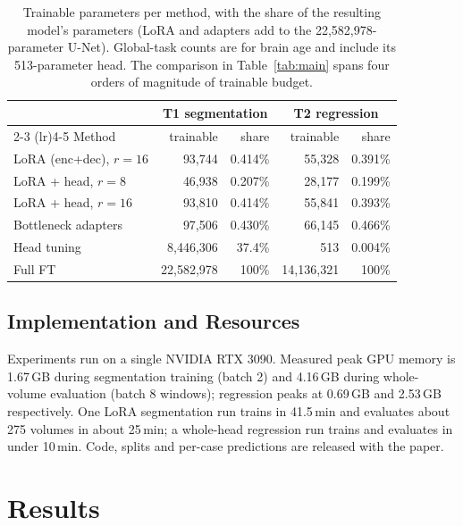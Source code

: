 \iffull\documentclass[journal]{IEEEtran}\else\documentclass[journal,twoside,web]{ieeecolor}\usepackage{generic}\fi
\begin{document}
\iffull  %
\begin{table}[t]
\caption{Trainable parameters per method, with the share of the resulting model's parameters (LoRA and adapters add to the 22,582,978-parameter U-Net). Global-task counts are for brain age and include its 513-parameter head. The comparison in Table~\ref{tab:main} spans four orders of magnitude of trainable budget.}
\label{tab:params}
\centering
\footnotesize
\setlength{\tabcolsep}{4pt}
\begin{tabular}{lrrrr}
\toprule
 & \multicolumn{2}{c}{T1 segmentation} & \multicolumn{2}{c}{T2 regression} \\
\cmidrule(lr){2-3} \cmidrule(lr){4-5}
Method & trainable & share & trainable & share \\
\midrule
LoRA (enc+dec), $r{=}16$  & 93,744     & 0.414\%  & 55,328     & 0.391\% \\
LoRA + head, $r{=}8$      & 46,938     & 0.207\%  & 28,177     & 0.199\% \\
LoRA + head, $r{=}16$     & 93,810     & 0.414\%  & 55,841     & 0.393\% \\
Bottleneck adapters       & 97,506     & 0.430\%  & 66,145     & 0.466\% \\
Head tuning         & 8,446,306  & 37.4\%   & 513        & 0.004\% \\
Full FT             & 22,582,978 & 100\%    & 14,136,321 & 100\% \\
\bottomrule
\end{tabular}
\end{table}
\fi  %

\subsection{Implementation and Resources}
\label{sec:impl}

Experiments run on a single NVIDIA RTX 3090. Measured peak GPU memory is 1.67\,GB during segmentation training (batch 2) and 4.16\,GB during whole-volume evaluation (batch 8 windows); regression peaks at 0.69\,GB and 2.53\,GB respectively. One LoRA segmentation run trains in 41.5\,min and evaluates about 275 volumes in about 25\,min; a whole-head regression run trains and evaluates in under 10\,min. Code, splits and per-case predictions are released with the paper.

\section{Results}
\label{sec:results}
\end{document}
